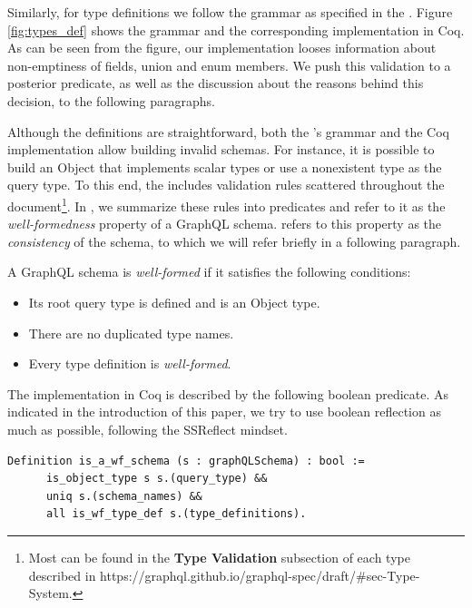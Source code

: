 Similarly, for type definitions we follow the grammar as specified in the \spec{}. Figure \ref{fig:types_def} shows the grammar and the corresponding implementation in Coq. As can be seen from the figure, our implementation looses information about non-emptiness of fields, union and enum members. We push this validation to a posterior predicate, as well as the discussion about the reasons behind this decision, to the following paragraphs.


Although the definitions are straightforward, both the \spec{}'s grammar and the Coq implementation allow building invalid schemas. For instance, it is possible to build an Object that implements scalar types or use a nonexistent type as the query type. To this end, the \spec{} includes validation rules scattered throughout the document\footnote{Most can be found in the \textbf{Type Validation} subsection of each type described in https://graphql.github.io/graphql-spec/draft/\#sec-Type-System.}. In \coql, we summarize these rules into predicates and refer to it as the \textit{well-formedness} property of a GraphQL schema. \HP{} refers to this property as the \textit{consistency} of the schema, to which we will refer briefly in a following paragraph.


\begin{definition}
A GraphQL schema is \textit{well-formed} if it satisfies the following conditions:
\begin{itemize}
    \item Its root query type is defined and is an Object type.
    \item There are no duplicated type names.
    \item Every type definition is \textit{well-formed}.
\end{itemize}
\end{definition}

The implementation in Coq is described by the following boolean predicate. As indicated in the introduction of this paper, we try to use boolean reflection as much as possible, following the SSReflect mindset.

\begin{verbatim}
Definition is_a_wf_schema (s : graphQLSchema) : bool :=
      is_object_type s s.(query_type) &&
      uniq s.(schema_names) &&
      all is_wf_type_def s.(type_definitions).
\end{verbatim}

